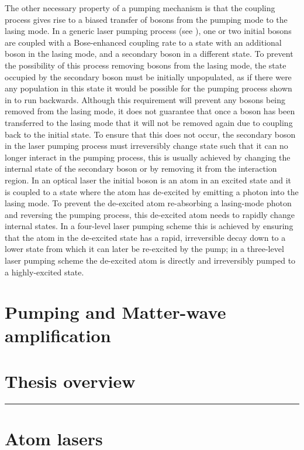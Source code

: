 The other necessary property of a pumping mechanism is that the coupling process gives rise to a biased transfer of bosons from the pumping mode to the lasing mode.  In a generic laser pumping process (see ), one or two initial bosons are coupled with a Bose-enhanced coupling rate to a state with an additional boson in the lasing mode, and a secondary boson in a different state.  To prevent the possibility of this process removing bosons from the lasing mode, the state occupied by the secondary boson must be initially unpopulated, as if there were any population in this state it would be possible for the pumping process shown in  to run backwards.  Although this requirement will prevent any bosons being removed from the lasing mode, it does not guarantee that once a boson has been transferred to the lasing mode that it will not be removed again due to coupling back to the initial state.  To ensure that this does not occur, the secondary boson in the laser pumping process must irreversibly change state such that it can no longer interact in the pumping process, this is usually achieved by changing the internal state of the secondary boson or by removing it from the interaction region.  In an optical laser the initial boson is an atom in an excited state and it is coupled to a state where the atom has de-excited by emitting a photon into the lasing mode. To prevent the de-excited atom re-absorbing a lasing-mode photon and reversing the pumping process, this de-excited atom needs to rapidly change internal states. In a four-level laser pumping scheme this is achieved by ensuring that the atom in the de-excited state has a rapid, irreversible decay down to a lower state from which it can later be re-excited by the pump; in a three-level laser pumping scheme the de-excited atom is directly and irreversibly pumped to a highly-excited state.

\section{Pumping and Matter-wave amplification}

\section{Thesis overview}

\hrule

\section{Atom lasers}
\label{Introduction:AtomLaser}



